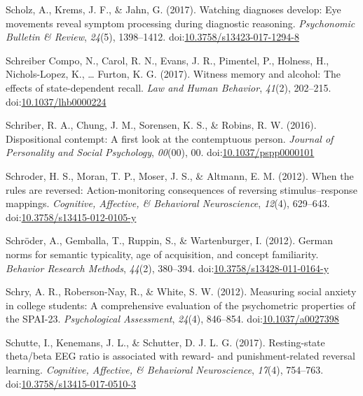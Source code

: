 \documentclass[english,man]{apa6}
\theoremstyle{definition}
\theoremstyle{definition}
\theoremstyle{definition}
\theoremstyle{remark}
\begin{document}
\hypertarget{ref-Scholz2017}{}
Scholz, A., Krems, J. F., \& Jahn, G. (2017). Watching diagnoses
develop: Eye movements reveal symptom processing during diagnostic
reasoning. \emph{Psychonomic Bulletin \& Review}, \emph{24}(5),
1398--1412.
doi:\href{https://doi.org/10.3758/s13423-017-1294-8}{10.3758/s13423-017-1294-8}

\hypertarget{ref-SchreiberCompo2017}{}
Schreiber Compo, N., Carol, R. N., Evans, J. R., Pimentel, P., Holness,
H., Nichols-Lopez, K., \ldots{} Furton, K. G. (2017). Witness memory and
alcohol: The effects of state-dependent recall. \emph{Law and Human
Behavior}, \emph{41}(2), 202--215.
doi:\href{https://doi.org/10.1037/lhb0000224}{10.1037/lhb0000224}

\hypertarget{ref-Schriber2016}{}
Schriber, R. A., Chung, J. M., Sorensen, K. S., \& Robins, R. W. (2016).
Dispositional contempt: A first look at the contemptuous person.
\emph{Journal of Personality and Social Psychology}, \emph{00}(00), 00.
doi:\href{https://doi.org/10.1037/pspp0000101}{10.1037/pspp0000101}

\hypertarget{ref-Schroder2012}{}
Schroder, H. S., Moran, T. P., Moser, J. S., \& Altmann, E. M. (2012).
When the rules are reversed: Action-monitoring consequences of reversing
stimulus--response mappings. \emph{Cognitive, Affective, \& Behavioral
Neuroscience}, \emph{12}(4), 629--643.
doi:\href{https://doi.org/10.3758/s13415-012-0105-y}{10.3758/s13415-012-0105-y}

\hypertarget{ref-Schroder2012a}{}
Schröder, A., Gemballa, T., Ruppin, S., \& Wartenburger, I. (2012).
German norms for semantic typicality, age of acquisition, and concept
familiarity. \emph{Behavior Research Methods}, \emph{44}(2), 380--394.
doi:\href{https://doi.org/10.3758/s13428-011-0164-y}{10.3758/s13428-011-0164-y}

\hypertarget{ref-Schry2012}{}
Schry, A. R., Roberson-Nay, R., \& White, S. W. (2012). Measuring social
anxiety in college students: A comprehensive evaluation of the
psychometric properties of the SPAI-23. \emph{Psychological Assessment},
\emph{24}(4), 846--854.
doi:\href{https://doi.org/10.1037/a0027398}{10.1037/a0027398}

\hypertarget{ref-Schutte2017}{}
Schutte, I., Kenemans, J. L., \& Schutter, D. J. L. G. (2017).
Resting-state theta/beta EEG ratio is associated with reward- and
punishment-related reversal learning. \emph{Cognitive, Affective, \&
Behavioral Neuroscience}, \emph{17}(4), 754--763.
doi:\href{https://doi.org/10.3758/s13415-017-0510-3}{10.3758/s13415-017-0510-3}
\end{document}
